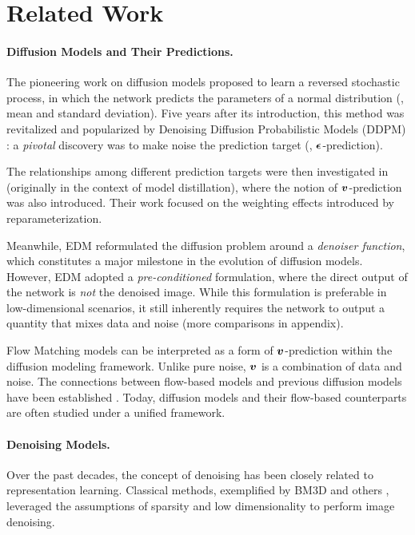 
\section{Related Work}

\paragraph{Diffusion Models and Their Predictions.} The pioneering work on diffusion models \cite{SohlDickstein2015} proposed to learn a reversed stochastic process, in which the network predicts the parameters of a normal distribution (\eg, mean and standard deviation). Five years after its introduction, this method was revitalized and popularized by Denoising Diffusion Probabilistic Models (DDPM) \cite{Ho2020}: a \textit{pivotal} discovery was to make noise the prediction target (\ie, $\bm{\epsilon}$-prediction). 

The relationships among different prediction targets were then investigated in \cite{salimans2022progressive} (originally in the context of model distillation), where the notion of $\bm{v}$-prediction was also introduced. Their work focused on the weighting effects introduced by reparameterization.

Meanwhile, EDM \cite{Karras2022edm} reformulated the diffusion problem around a \textit{denoiser function}, which constitutes a major milestone in the evolution of diffusion models. However, EDM adopted a \textit{pre-conditioned} formulation, where the direct output of the network is \textit{not} the denoised image. While this formulation is preferable in low-dimensional scenarios, it still inherently requires the network to output a quantity that mixes data and noise (more comparisons in appendix).

Flow Matching models \cite{lipman2022flow,liu2022flow,albergo2023building} can be interpreted as a form of $\bm{v}$-prediction \cite{salimans2022progressive} within the diffusion modeling framework. 
Unlike pure noise, $\bm{v}$ is a combination of data and noise.
The connections between flow-based models and previous diffusion models have been established \cite{esser2024scaling}.
Today, diffusion models and their flow-based counterparts are often studied under a unified framework.

\paragraph{Denoising Models.} Over the past decades, the concept of denoising has been closely related to representation learning.
Classical methods, exemplified by BM3D \cite{dabov2007image} and others \cite{portilla2003image,elad2006image,zoran2011learning}, leveraged the assumptions of sparsity and low dimensionality to perform image denoising.

